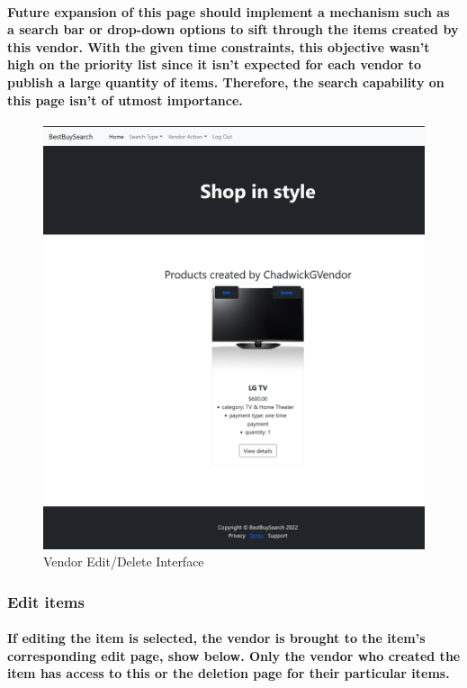 \documentclass[sigconf]{acmart}
\begin{document}
\paragraph{Future expansion of this page should implement a mechanism such as a search bar or drop-down options to sift through the items created by this vendor. With the given time constraints, this objective wasn't high on the priority list since it isn't expected for each vendor to publish a large quantity of items. Therefore, the search capability on this page isn't of utmost importance.}

\begin{figure}[H]
    \centering
    \includegraphics[scale=0.2]{VendorEditDelete.PNG}
    \caption{Vendor Edit/Delete Interface}
    \label{fig:my_label}
\end{figure}

\subsubsection{Edit items}

\paragraph{If editing the item is selected, the vendor is brought to the item's corresponding edit page, show below. Only the vendor who created the item has access to this or the deletion page for their particular items.}
\end{document}
